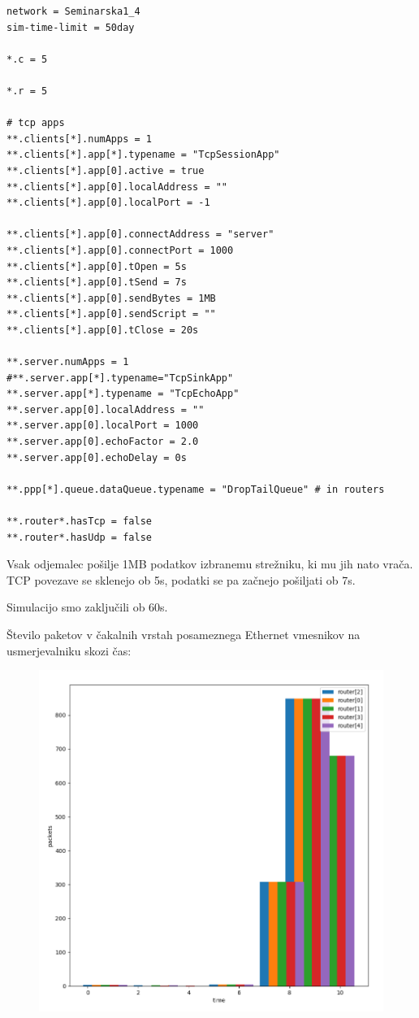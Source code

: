 \documentclass[11pt,a4paper,slovene]{myarticle}
\begin{document}
\begin{lstlisting}
network = Seminarska1_4
sim-time-limit = 50day

*.c = 5

*.r = 5 

# tcp apps
**.clients[*].numApps = 1
**.clients[*].app[*].typename = "TcpSessionApp"
**.clients[*].app[0].active = true
**.clients[*].app[0].localAddress = ""
**.clients[*].app[0].localPort = -1

**.clients[*].app[0].connectAddress = "server"
**.clients[*].app[0].connectPort = 1000
**.clients[*].app[0].tOpen = 5s
**.clients[*].app[0].tSend = 7s
**.clients[*].app[0].sendBytes = 1MB
**.clients[*].app[0].sendScript = ""
**.clients[*].app[0].tClose = 20s

**.server.numApps = 1
#**.server.app[*].typename="TcpSinkApp"
**.server.app[*].typename = "TcpEchoApp"
**.server.app[0].localAddress = ""
**.server.app[0].localPort = 1000
**.server.app[0].echoFactor = 2.0
**.server.app[0].echoDelay = 0s

**.ppp[*].queue.dataQueue.typename = "DropTailQueue" # in routers

**.router*.hasTcp = false
**.router*.hasUdp = false
\end{lstlisting}

Vsak odjemalec pošilje 1MB podatkov izbranemu strežniku, ki mu jih nato vrača.  TCP povezave se sklenejo ob 5s, podatki se pa začnejo pošiljati ob 7s.

Simulacijo smo zaključili ob 60s.

Število paketov v čakalnih vrstah posameznega Ethernet vmesnikov na usmerjevalniku skozi čas:
\begin{figure}[h]
  \includegraphics[width=\linewidth]{queuelength-4.png}
\end{figure}
\end{document}
